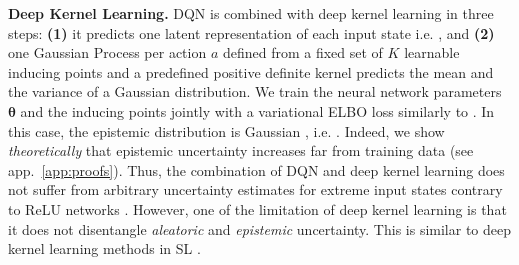 \textbf{Deep Kernel Learning.} DQN is combined with deep kernel learning \cite{due} in three steps: \textbf{(1)} it predicts one latent representation of each input state i.e. , and \textbf{(2)} one Gaussian Process per action $a$ defined from a fixed set of $K$ learnable inducing points  and a predefined positive definite kernel \smash{$\kappa(\cdot, \cdot)$} predicts the mean  and the variance  of a Gaussian distribution. We train the neural network parameters $\bm{\theta}$ and the inducing points  jointly with a variational ELBO loss similarly to \cite{due}. In this case, the epistemic distribution is Gaussian \cite{simple-baseline-uncertainty}, i.e. . Indeed, we show \emph{theoretically} that epistemic uncertainty increases far from training data (see app.~\ref{app:proofs}). Thus, the combination of DQN and deep kernel learning does not suffer from arbitrary uncertainty estimates for extreme input states contrary to ReLU networks \cite{overconfident-relu}. However, one of the limitation of deep kernel learning is that it does not disentangle \emph{aleatoric} and \emph{epistemic} uncertainty. This is similar to deep kernel learning methods in SL \cite{simple-baseline-uncertainty, due, duq}.

